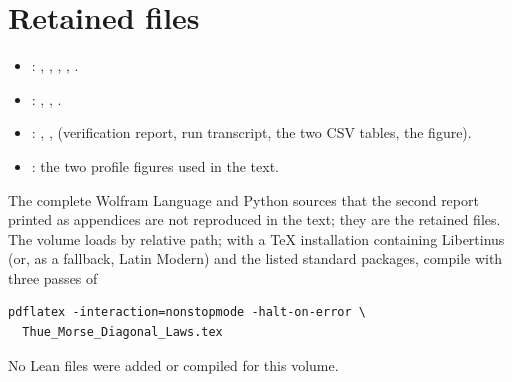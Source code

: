 \documentclass[11pt,a4paper,oneside,openany]{book}
\numberwithin{equation}{chapter}
\theoremstyle{definition}
\theoremstyle{remark}
\begin{document}
\section{Retained files}
\begin{itemize}
\item {}: ,
, ,
, .
\item {}: ,
, .
\item {}: ,
,  (verification report,
run transcript, the two CSV tables, the figure).
\item {}: the two profile figures used in the text.
\end{itemize}
The complete Wolfram Language and Python sources that the second report
printed as appendices are not reproduced in the text; they are the retained
files. The volume loads  by relative path;
with a \TeX{} installation containing Libertinus (or, as a fallback, Latin
Modern) and the listed standard packages, compile with three passes of
\begin{verbatim}
pdflatex -interaction=nonstopmode -halt-on-error \
  Thue_Morse_Diagonal_Laws.tex
\end{verbatim}
No Lean files were added or compiled for this volume.

\end{document}
